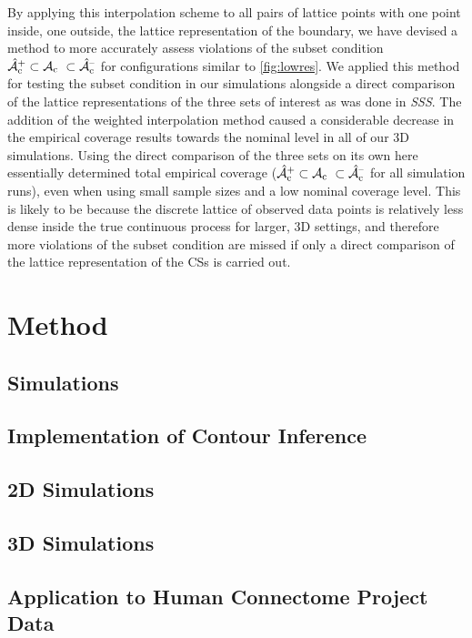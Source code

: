 By applying this interpolation scheme to all pairs of lattice points with one point inside, one outside, the lattice representation of the boundary, we have devised a method to more accurately assess violations of the subset condition $\Ahatcp \subset \Ac \ \subset \Ahatcm$ for configurations similar to \ref{fig:lowres}. We applied this method for testing the subset condition in our simulations alongside a direct comparison of the lattice representations of the three sets of interest as was done in \textit{SSS}. The addition of the weighted interpolation method caused a considerable decrease in the empirical coverage results towards the nominal level in all of our 3D simulations. Using the direct comparison of the three sets on its own here essentially determined total empirical coverage ($\Ahatcp \subset \Ac \ \subset \Ahatcm$ for all simulation runs), even when using small sample sizes and a low nominal coverage level. This is likely to be because the discrete lattice of observed data points is relatively less dense inside the true continuous process for larger, 3D settings, and therefore more violations of the subset condition are missed if only a direct comparison of the lattice representation of the CSs is carried out.

\section{Method}
 
\subsection{Simulations}

\subsection{Implementation of Contour Inference}

\subsection{2D Simulations}

\subsection{3D Simulations}

\subsection{Application to Human Connectome Project Data}

